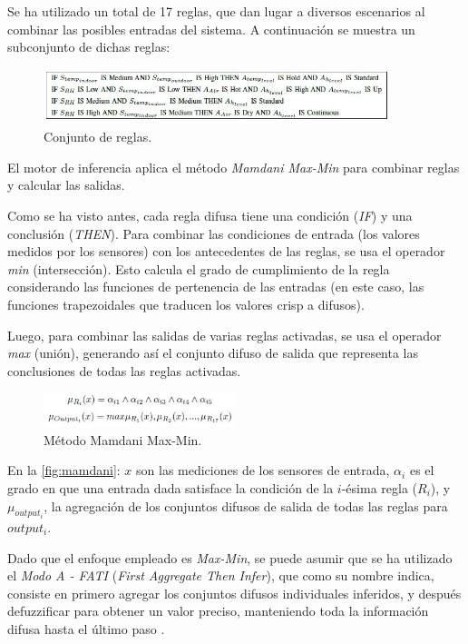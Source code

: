 \begin{enumerate}
	Se ha utilizado un total de 17 reglas, que dan lugar a diversos escenarios al combinar las posibles entradas del sistema. A continuación se muestra un subconjunto de dichas reglas:
	
	\begin{figure}[H]
		\centering
		\includegraphics[width=0.9\textwidth]{imgs/set-of-rules.JPG}
		\caption{Conjunto de reglas.}
		\label{fig:set-of-rules}
	\end{figure}
	
\end{enumerate}

El motor de inferencia aplica el método \textit{Mamdani Max-Min} para combinar reglas y calcular las salidas. 

Como se ha visto antes, cada regla difusa tiene una condición (\textit{IF}) y una conclusión (\textit{THEN}). Para combinar las condiciones de entrada (los valores medidos por los sensores) con los antecedentes de las reglas, se usa el operador \textit{min} (intersección). Esto calcula el grado de cumplimiento de la regla considerando las funciones de pertenencia de las entradas (en este caso, las funciones trapezoidales que traducen los valores crisp a difusos).

Luego, para combinar las salidas de varias reglas activadas, se usa el operador \textit{max} (unión), generando así el conjunto difuso de salida que representa las conclusiones de todas las reglas activadas.

\begin{figure}[H]
	\centering
	\includegraphics[width=0.50\textwidth]{imgs/mamdani.JPG}
	\caption{Método Mamdani Max-Min.}
	\label{fig:mamdani}
\end{figure}

En la \autoref{fig:mamdani}: $x$ son las mediciones de los sensores de entrada, $\alpha_i$ es el grado en que una entrada dada satisface la condición de la $i$-ésima regla ($R_i$), y $\mu_{output_i}$, la agregación de los conjuntos difusos de salida de todas las reglas para $output_i$.

Dado que el enfoque empleado es \textit{Max-Min}, se puede asumir que se ha utilizado el \textit{Modo A - FATI} (\textit{First Aggregate Then Infer}), que como su nombre indica, consiste en primero agregar los conjuntos difusos individuales inferidos, y después defuzzificar para obtener un valor preciso, manteniendo toda la información difusa hasta el último paso \parencite{peregrin2000integracion}.

